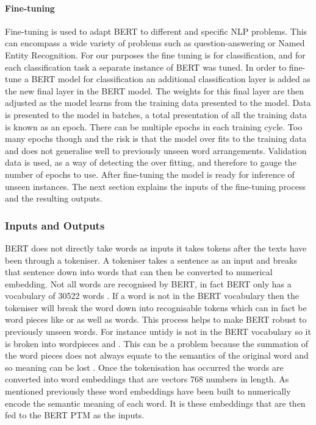 \paragraph{Fine-tuning} Fine-tuning is used to adapt BERT to different and specific NLP problems. This can encompass a wide variety of problems such as question-answering or Named Entity Recognition. For our purposes the fine tuning is for classification, and for each classification task a separate instance of BERT was tuned. In order to fine-tune a BERT model for classification an additional classification layer is added as the new final layer in the BERT model. The weights for this final layer are then adjusted as the model learns from the training data presented to the model. Data is presented to the model in batches, a total presentation of all the training data is known as an epoch. There can be multiple epochs in each training cycle. Too many epochs though and the risk is that the model over fits to the training data and does not generalise well to previously unseen word arrangements. Validation data is used, as a way of detecting the over fitting, and therefore to gauge the number of epochs to use. After fine-tuning the model is ready for inference of unseen instances. The next section explains the inputs of the fine-tuning process and the resulting outputs.

\subsubsection{Inputs and Outputs} BERT does not directly take words as inputs it takes tokens after the texts have been through a tokeniser. A tokeniser takes a sentence as an input and breaks that sentence down into words that can then be converted to numerical embedding. Not all words are recognised by BERT, in fact BERT only has a vocabulary of 30522 words \parencite{nayak-etal-2020-domain}. If a word is not in the BERT vocabulary then the tokeniser will break the word down into recognisable tokens which can in fact be word pieces like  or  as well as words. This process helps to make BERT robust to previously unseen words. For instance untidy is not in the BERT vocabulary so it is broken into wordpieces  and . This can be a problem because the summation of the word pieces does not always equate to the semantics of the original word and so meaning can be lost \parencite{nayak-etal-2020-domain}. Once the  tokenisation has occurred the words are converted into word embeddings that are vectors 768 numbers in length. As mentioned previously these word embeddings have been built to numerically encode the semantic meaning of each word. It is these embeddings that are then fed to the BERT PTM as the inputs.

